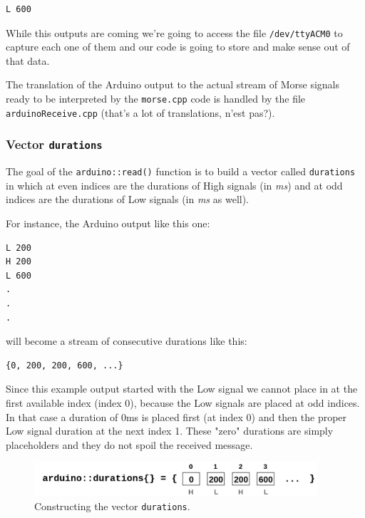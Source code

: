 \documentclass[10pt]{report}
\begin{document}
\begin{snugshade}
\begin{verbatim}
L 600
\end{verbatim}
\end{snugshade}

While this outputs are coming we're going to access the file \texttt{/dev/ttyACM0} to capture each one of them and our code is going to store and make sense out of that data.

The translation of the Arduino output to the actual stream of Morse signals ready to be interpreted by the \texttt{morse.cpp} code is handled by the file \texttt{arduinoReceive.cpp} (that's a lot of translations, n'est pas?).

\subsubsection{Vector \texttt{durations}}

The goal of the \texttt{arduino::read()} function is to build a vector called \texttt{durations} in which at even indices are the durations of High signals (in \textit{ms}) and at odd indices are the durations of Low signals (in \textit{ms} as well).

For instance, the Arduino output like this one:

\begin{snugshade}
\begin{verbatim}
L 200
H 200
L 600
.
.
.
\end{verbatim}
\end{snugshade}

will become a stream of consecutive durations like this:

\begin{snugshade}
\begin{verbatim}
{0, 200, 200, 600, ...}
\end{verbatim}
\end{snugshade}

Since this example output started with the Low signal we cannot place in at the first available index (index 0), because the Low signals are placed at odd indices. In that case a duration of 0ms is placed first (at index 0) and then the proper Low signal duration at the next index 1. These "zero" durations are simply placeholders and they do not spoil the received message.

\begin{figure}[H]
\centering\includegraphics[width=10.5cm]{durations.png}
\caption{Constructing the vector \texttt{durations}.}				
\label{fig:timedur}
\end{figure}
\end{document}
